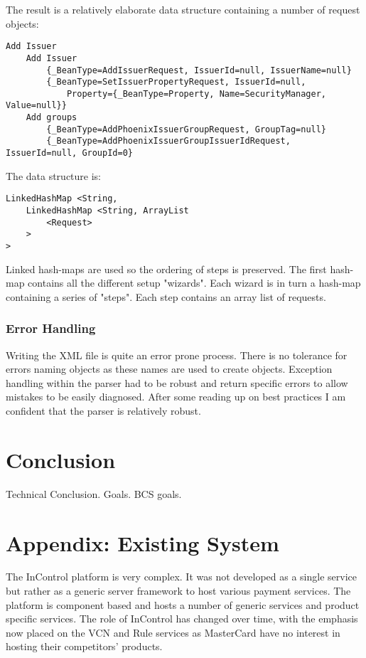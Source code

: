 \documentclass[a4paper, 11pt, titlepage]{article}
\begin{document}
The result is a relatively elaborate data structure containing a number of request objects: 
 
\begin{verbatim} 
Add Issuer 
    Add Issuer 
        {_BeanType=AddIssuerRequest, IssuerId=null, IssuerName=null} 
        {_BeanType=SetIssuerPropertyRequest, IssuerId=null, 
            Property={_BeanType=Property, Name=SecurityManager, Value=null}} 
    Add groups 
        {_BeanType=AddPhoenixIssuerGroupRequest, GroupTag=null} 
        {_BeanType=AddPhoenixIssuerGroupIssuerIdRequest, IssuerId=null, GroupId=0} 
\end{verbatim} 
 
The data structure is: 
 
\begin{verbatim} 
LinkedHashMap <String,  
    LinkedHashMap <String, ArrayList 
        <Request> 
    > 
> 
\end{verbatim} 
 
Linked hash-maps are used so the ordering of steps is preserved. The first hash-map contains all the different setup "wizards". Each wizard is in turn a hash-map containing a series of "steps". Each step contains an array list of requests. 
\subsubsection{Error Handling} 
 
Writing the XML file is quite an error prone process. There is no tolerance for errors naming objects as these names are used to create objects. Exception handling within the parser had to be robust and return specific errors to allow mistakes to be easily diagnosed. After some reading up on best practices I am confident that the parser is relatively robust. 
\cite{http://www.wikijava.org/wiki/10_best_practices_with_Exceptions Is it appropriate to link a wiki?} 
 
\section{Conclusion} 
Technical Conclusion. Goals. BCS goals. 
 
 
 
\section{Appendix: Existing System} 
 
The InControl platform is very complex. It was not developed as a single service but rather as a generic server framework to host various payment services. The platform is component based and hosts a number of generic services and product specific services. The role of InControl has changed over time, with the emphasis now placed on the VCN and Rule services as MasterCard have no interest in hosting their competitors’ products. 
 
\end{document}
